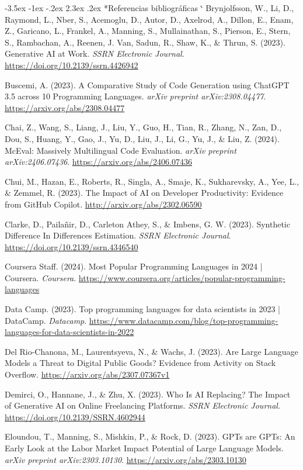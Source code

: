 \documentclass[12pt,a4paper]{article}
\makeatletter
\renewcommand{\refname}{\centering\normalfont Referencias bibliográficas}%
\renewcommand\section{\@startsection{section}{1}{\z@}%
  {-3.5ex \@plus -1ex \@minus -.2ex}%
  {2.3ex \@plus.2ex}%
  {\normalfont\normalsize}}
\renewenvironment{thebibliography}[1]{%
  \section*{\refname}%
  \list{}{%
    \usecounter{enumiv}%
    \setlength{\labelwidth}{0pt}%
    \setlength{\labelsep}{0pt}%
    \setlength{\leftmargin}{1.27cm}%
    \setlength{\itemindent}{-1.27cm}%
    \setlength{\itemsep}{\baselineskip}%
    \setlength{\parsep}{0pt}%
  }%
  \sloppy
  \clubpenalty4000\widowpenalty4000%
  \sfcode`\.\@m}%
  {\def\@noitemerr{\@latex@warning{Empty `thebibliography' environment}}%
   \endlist}
\makeatother
\begin{document}
\begin{singlespacing}
\begin{thebibliography}{}
Brynjolfsson, W., Li, D., Raymond, L., Nber, S., Acemoglu, D., Autor, D., Axelrod, A., Dillon, E., Enam, Z., Garicano, L., Frankel, A., Manning, S., Mullainathan, S., Pierson, E., Stern, S., Rambachan, A., Reenen, J. Van, Sadun, R., Shaw, K., \& Thrun, S. (2023). Generative AI at Work. \textit{SSRN Electronic Journal}. \url{https://doi.org/10.2139/ssrn.4426942}

Buscemi, A. (2023). A Comparative Study of Code Generation using ChatGPT 3.5 across 10 Programming Languages. \textit{arXiv preprint arXiv:2308.04477}. \url{https://arxiv.org/abs/2308.04477}

Chai, Z., Wang, S., Liang, J., Liu, Y., Guo, H., Tian, R., Zhang, N., Zan, D., Dou, S., Huang, Y., Gao, J., Yu, D., Liu, J., Li, G., Yu, J., \& Liu, Z. (2024). McEval: Massively Multilingual Code Evaluation. \textit{arXiv preprint arXiv:2406.07436}. \url{https://arxiv.org/abs/2406.07436}

Chui, M., Hazan, E., Roberts, R., Singla, A., Smaje, K., Sukharevsky, A., Yee, L., \& Zemmel, R. (2023). The Impact of AI on Developer Productivity: Evidence from GitHub Copilot. \url{http://arxiv.org/abs/2302.06590}

Clarke, D., Pailañir, D., Carleton Athey, S., \& Imbens, G. W. (2023). Synthetic Difference In Differences Estimation. \textit{SSRN Electronic Journal}. \url{https://doi.org/10.2139/ssrn.4346540}

Coursera Staff. (2024). Most Popular Programming Languages in 2024 | Coursera. \textit{Coursera}. \url{https://www.coursera.org/articles/popular-programming-languages}

Data Camp. (2023). Top programming languages for data scientists in 2023 | DataCamp. \textit{Datacamp}. \url{https://www.datacamp.com/blog/top-programming-languages-for-data-scientists-in-2022}

Del Rio-Chanona, M., Laurentsyeva, N., \& Wachs, J. (2023). Are Large Language Models a Threat to Digital Public Goods? Evidence from Activity on Stack Overflow. \url{https://arxiv.org/abs/2307.07367v1}

Demirci, O., Hannane, J., \& Zhu, X. (2023). Who Is AI Replacing? The Impact of Generative AI on Online Freelancing Platforms. \textit{SSRN Electronic Journal}. \url{https://doi.org/10.2139/SSRN.4602944}

Eloundou, T., Manning, S., Mishkin, P., \& Rock, D. (2023). GPTs are GPTs: An Early Look at the Labor Market Impact Potential of Large Language Models. \textit{arXiv preprint arXiv:2303.10130}. \url{https://arxiv.org/abs/2303.10130}


\end{thebibliography}
\end{singlespacing}
\end{document}
